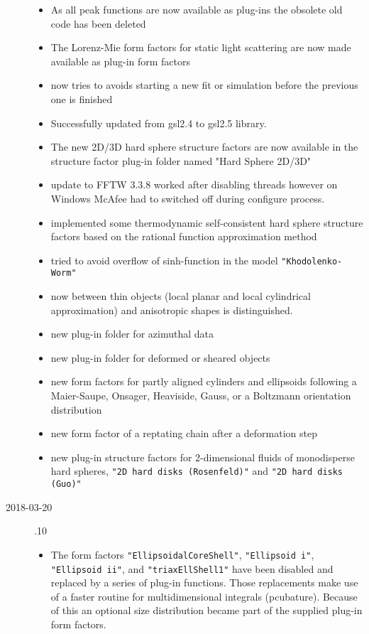\begin{description}
\begin{itemize}
    \item As all peak functions are now available as plug-ins the obsolete old code has been deleted
    \item The Lorenz-Mie form factors for static light scattering are now made available as plug-in form factors
    \item \SASfit now tries to avoids starting a new fit or simulation before the previous one is finished
    \item Successfully updated from gsl2.4 to gsl2.5 library.
    \item The new 2D/3D hard sphere structure factors are now available in the structure factor plug-in folder named "Hard Sphere 2D/3D"
    \item update to FFTW 3.3.8 worked after disabling threads however on Windows McAfee had to switched off during configure process.
    \item implemented some thermodynamic self-consistent hard sphere structure factors based on the rational function approximation method
    \item tried to avoid overflow of sinh-function in the model \texttt{"Khodolenko-Worm"}
    \item now between thin objects (local planar and local cylindrical approximation) and anisotropic shapes is distinguished.
    \item new plug-in folder for azimuthal data
    \item new plug-in folder for deformed or sheared objects
    \item new form factors for partly aligned cylinders and ellipsoids following a Maier-Saupe, Onsager, Heaviside, Gauss, or a Boltzmann orientation distribution
    \item new form factor of a reptating chain after a deformation step
    \item new plug-in structure factors for 2-dimensional fluids of monodisperse hard spheres, \texttt{"2D hard disks (Rosenfeld)"} and \texttt{"2D hard disks (Guo)"}
    \end{itemize}
\item[2018-03-20] .10
    \begin{itemize}
    \item The form factors \texttt{"EllipsoidalCoreShell"}, \texttt{"Ellipsoid i"}, \texttt{"Ellipsoid ii"}, and \texttt{"triaxEllShell1"} have been disabled and replaced by a series of plug-in functions. Those replacements make use of a faster routine for multidimensional integrals (pcubature). Because of this an optional size distribution became part of the supplied plug-in form factors.

\end{itemize}
\end{description}

